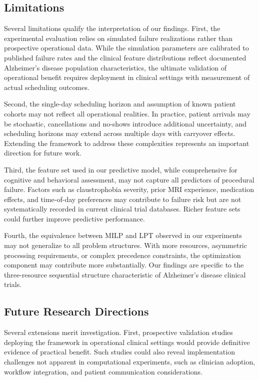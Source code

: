 \documentclass[11pt,a4paper]{article}
\begin{document}
\subsection{Limitations}

Several limitations qualify the interpretation of our findings. First, the experimental evaluation relies on simulated failure realizations rather than prospective operational data. While the simulation parameters are calibrated to published failure rates and the clinical feature distributions reflect documented Alzheimer's disease population characteristics, the ultimate validation of operational benefit requires deployment in clinical settings with measurement of actual scheduling outcomes.

Second, the single-day scheduling horizon and assumption of known patient cohorts may not reflect all operational realities. In practice, patient arrivals may be stochastic, cancellations and no-shows introduce additional uncertainty, and scheduling horizons may extend across multiple days with carryover effects. Extending the framework to address these complexities represents an important direction for future work.

Third, the feature set used in our predictive model, while comprehensive for cognitive and behavioral assessment, may not capture all predictors of procedural failure. Factors such as claustrophobia severity, prior MRI experience, medication effects, and time-of-day preferences may contribute to failure risk but are not systematically recorded in current clinical trial databases. Richer feature sets could further improve predictive performance.

Fourth, the equivalence between MILP and LPT observed in our experiments may not generalize to all problem structures. With more resources, asymmetric processing requirements, or complex precedence constraints, the optimization component may contribute more substantially. Our findings are specific to the three-resource sequential structure characteristic of Alzheimer's disease clinical trials.

\subsection{Future Research Directions}

Several extensions merit investigation. First, prospective validation studies deploying the framework in operational clinical settings would provide definitive evidence of practical benefit. Such studies could also reveal implementation challenges not apparent in computational experiments, such as clinician adoption, workflow integration, and patient communication considerations.
\end{document}
